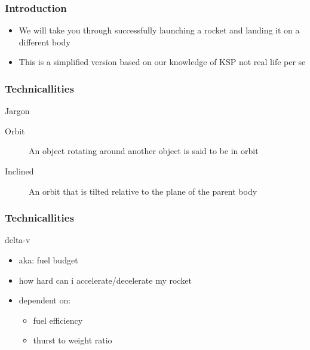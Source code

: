 \begin{frame}
    \frametitle{Introduction}
    \begin{block}{}
        \begin{itemize}
            \item We will take you through successfully launching a rocket and landing it on a different body
            \item This is a simplified version based on our knowledge of KSP not real life per se
        \end{itemize}
    \end{block}
\end{frame}
\begin{frame}
    \frametitle{Technicallities}
    \begin{block}{Jargon}
        \begin{description}
            \item [Orbit] An object rotating around another object is said to be in orbit
            \item [Inclined] An orbit that is tilted relative to the plane of the parent body
        \end{description}
    \end{block}
\end{frame}
\begin{frame}
    \frametitle{Technicallities}
    \begin{block}{delta-v}
        \begin{itemize}
            \item aka: fuel budget
            \item how hard can i accelerate/decelerate my rocket
            \item dependent on:
            \begin{itemize}
                \item fuel efficiency
                \item thurst to weight ratio
            \end{itemize}
        \end{itemize}
    \end{block}
\end{frame}
